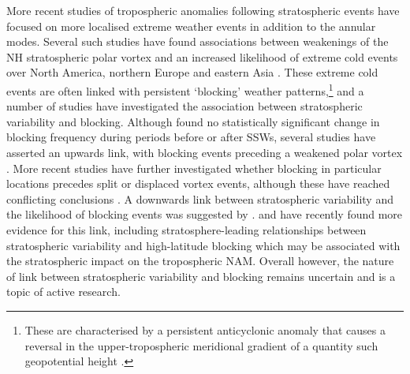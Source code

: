 More recent studies of tropospheric anomalies following stratospheric events
have focused on more localised extreme weather events in addition to the
annular modes. Several such studies have found associations between weakenings
of the NH stratospheric polar vortex and an increased likelihood of extreme cold
events over North America, northern Europe and eastern Asia \citep{Thompson2002,
  Kolstad2010, Tomassini2012}. These extreme cold events are often linked with
persistent `blocking' weather patterns,\footnote{These are characterised by a
  persistent anticyclonic anomaly that causes a reversal in the
  upper-tropospheric meridional gradient of a quantity such geopotential height
  \citep[e.g.,][]{Tibaldi1990}.}  and a number of studies have investigated the
association between stratospheric variability and blocking. Although
\citet{Taguchi2008} found no statistically significant change in blocking
frequency during periods before or after SSWs, several studies have asserted an
upwards link, with blocking events preceding a weakened polar vortex
\citep{Quiroz1986, Andrews1987, ONeill1994}. More recent studies have further
investigated whether blocking in particular locations precedes split or
displaced vortex events, although these have reached conflicting conclusions
\citep{Martius2009, Woollings2010c, Castanheira2010}. A downwards link between
stratospheric variability and the likelihood of blocking events was suggested by
\citet{Kodera1995}. \citet{Woollings2010c} and \citet{Davini2014} have recently
found more evidence for this link, including stratosphere-leading relationships
between stratospheric variability and high-latitude blocking which may be
associated with the stratospheric impact on the tropospheric NAM. Overall
however, the nature of link between stratospheric variability and blocking
remains uncertain and is a topic of active research.

